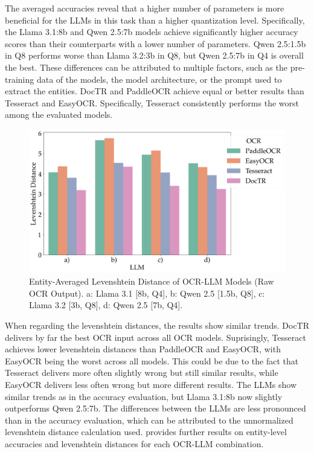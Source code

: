 \documentclass[11pt]{article}
\begin{document}
The averaged accuracies reveal that a higher number of parameters is more beneficial for the LLMs in this task than a higher quantization level. Specifically, the Llama 3.1:8b and Qwen 2.5:7b models achieve significantly higher accuracy scores than their counterparts with a lower number of parameters. Qwen 2.5:1.5b in Q8 performs worse than Llama 3.2:3b in Q8, but Qwen 2.5:7b in Q4 is overall the best. These differences can be attributed to multiple factors, such as the pre-training data of the models, the model architecture, or the prompt used to extract the entities. DocTR and PaddleOCR achieve equal or better results than Tesseract and EasyOCR. Specifically, Tesseract consistently performs the worst among the evaluated models.

\begin{figure}[h!]
    \centering
    \includegraphics[width=0.7\linewidth]{figures/avg_levdistances.png}
    \caption{Entity-Averaged Levenshtein Distance of OCR-LLM Models (Raw OCR Output). a: Llama 3.1 [8b, Q4], b: Qwen 2.5 [1.5b, Q8], c: Llama 3.2 [3b, Q8], d: Qwen 2.5 [7b, Q4].}
    \label{fig:eval_ocr_llm_levdist_avg}
\end{figure}

When regarding the levenshtein distances, the results show similar trends. DocTR delivers by far the best OCR input across all OCR models. Suprisingly, Tesseract achieves lower levenshtein distances than PaddleOCR and EasyOCR, with EasyOCR being the worst across all models. This could be due to the fact that Tesseract delivers more often slightly wrong but still similar results, while EasyOCR delivers less often wrong but more different results. The LLMs show similar trends as in the accuracy evaluation, but Llama 3.1:8b now slightly outperforms Qwen 2.5:7b. The differences between the LLMs are less pronounced than in the accuracy evaluation, which can be attributed to the unnormalized levenshtein distance calculation used.  provides further results on entity-level accuracies and levenshtein distances for each OCR-LLM combination.
\end{document}
